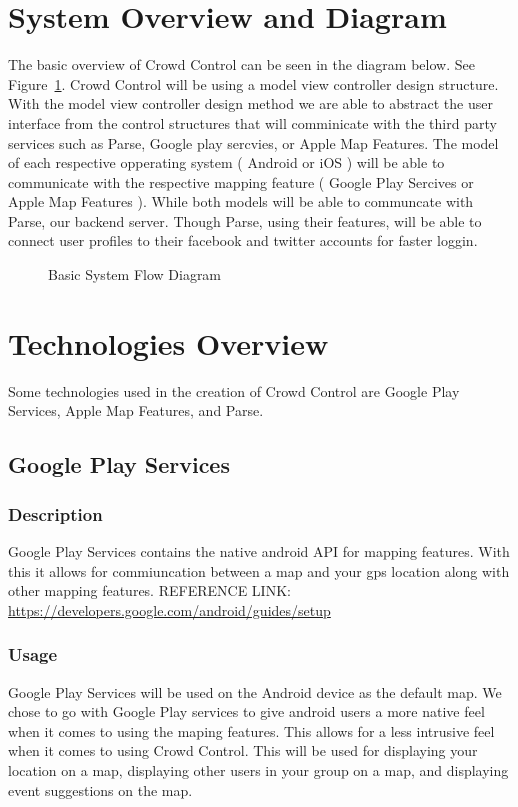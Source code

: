 \section{System Overview and Diagram}
The basic overview of Crowd Control can be seen in the diagram below. See Figure~\ref{ModuleFlowDiagram}. Crowd Control will be using a model view controller design structure. With the model view controller design method we are able to abstract the user interface from the control structures that will comminicate with the third party services such as Parse, Google play sercvies, or Apple Map Features. The model of each respective opperating system ( Android or iOS ) will be able to communicate with the respective mapping feature ( Google Play Sercives or Apple Map Features ). While both models will be able to communcate with Parse, our backend server. Though Parse, using their features, will be able to connect user profiles to their facebook and twitter accounts for faster loggin.

\begin{figure}[tbh]
\begin{center}
\end{center}
\caption{Basic System Flow Diagram \label{ModuleFlowDiagram}}
\end{figure}

\section{Technologies Overview}
Some technologies used in the creation of Crowd Control are Google Play Services, Apple Map Features, and Parse.

\subsection{Google Play Services}
	\subsubsection{Description}
	Google Play Services contains the native android API for mapping features. With this it allows for commiuncation between a map and your gps location along with other mapping features.
\newline
REFERENCE LINK:  \url{https://developers.google.com/android/guides/setup}
	\subsubsection{Usage}
	Google Play Services will be used on the Android device as the default map. We chose to go with Google Play services to give android users a more native feel when it comes to using the maping features. This allows for a less intrusive feel when it comes to using Crowd Control. This will be used for displaying your location on a map, displaying other users in your group on a map, and displaying event suggestions on the map.

